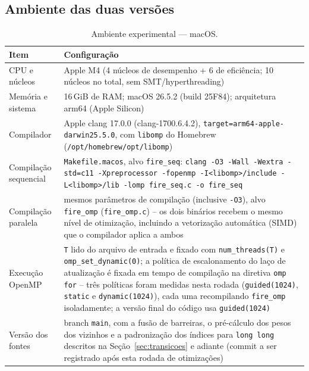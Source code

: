 \documentclass[12pt,a4paper]{article}
\begin{document}
\subsection{Ambiente das duas versões}
\begin{table}[H]
\centering
\caption{Ambiente experimental --- macOS.}
\begin{tabularx}{\linewidth}{lX}
\toprule
\textbf{Item} & \textbf{Configuração} \\
\midrule
CPU e núcleos & Apple M4 (4 núcleos de desempenho + 6 de eficiência; 10 núcleos no total, sem SMT/hyperthreading) \\
Memória e sistema & 16\,GiB de RAM; macOS 26.5.2 (build 25F84); arquitetura arm64 (Apple Silicon) \\
Compilador & Apple clang 17.0.0 (clang-1700.6.4.2), \texttt{target=arm64-apple-darwin25.5.0}, com \texttt{libomp} do Homebrew (\texttt{/opt/homebrew/opt/libomp}) \\
Compilação sequencial & \texttt{Makefile.macos}, alvo \texttt{fire\_seq}: \texttt{clang -O3 -Wall -Wextra -std=c11 -Xpreprocessor -fopenmp -I<libomp>/include -L<libomp>/lib -lomp fire\_seq.c -o fire\_seq} \\
Compilação paralela & mesmos parâmetros de compilação (inclusive \texttt{-O3}), alvo \texttt{fire\_omp} (\texttt{fire\_omp.c}) -- os dois binários recebem o mesmo nível de otimização, incluindo a vetorização automática (SIMD) que o compilador aplica a ambos \\
Execução OpenMP & \texttt{T} lido do arquivo de entrada e fixado com \texttt{num\_threads(T)} e \texttt{omp\_set\_dynamic(0)}; a política de escalonamento do laço de atualização é fixada em tempo de compilação na diretiva \texttt{omp for} -- três políticas foram medidas nesta rodada (\texttt{guided(1024)}, \texttt{static} e \texttt{dynamic(1024)}), cada uma recompilando \texttt{fire\_omp} isoladamente; a versão final do código usa \texttt{guided(1024)} \\
Versão dos fontes & branch \texttt{main}, com a fusão de barreiras, o
pré-cálculo dos pesos dos vizinhos e a padronização dos índices para
\texttt{long long} descritos na Seção~\ref{sec:transicoes} e adiante
(commit a ser registrado após esta rodada de otimizações) \\
\bottomrule
\end{tabularx}
\end{table}
\end{document}
